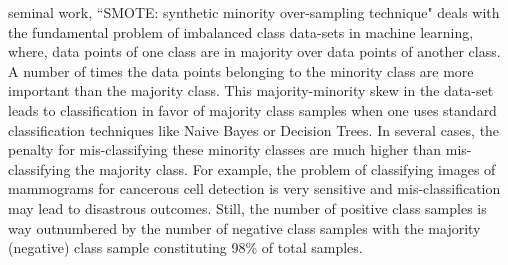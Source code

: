 \documentclass[10pt,journal,compsoc]{IEEEtran}
\begin{document}
%
\IEEEpeerreviewmaketitle







% 
% 
% 
% 
 seminal work, ``SMOTE: synthetic minority over-sampling technique"\cite{smote} deals with the fundamental  problem of imbalanced class data-sets in machine learning, where, data points of one class are in majority over data points of another class. A number of times the data points belonging to the minority class are more important than the majority class. This majority-minority skew in the data-set leads to classification in favor of majority class samples when one uses standard classification techniques like Naive Bayes or Decision Trees. In several cases, the penalty for mis-classifying these minority classes are much higher than mis-classifying the majority class. For example, the problem of classifying images of mammograms for cancerous cell detection is very sensitive and mis-classification may lead to disastrous outcomes. Still, the number of positive class samples is way outnumbered by the number of negative class samples with the majority (negative) class sample constituting 98\% of total samples.
\end{document}
